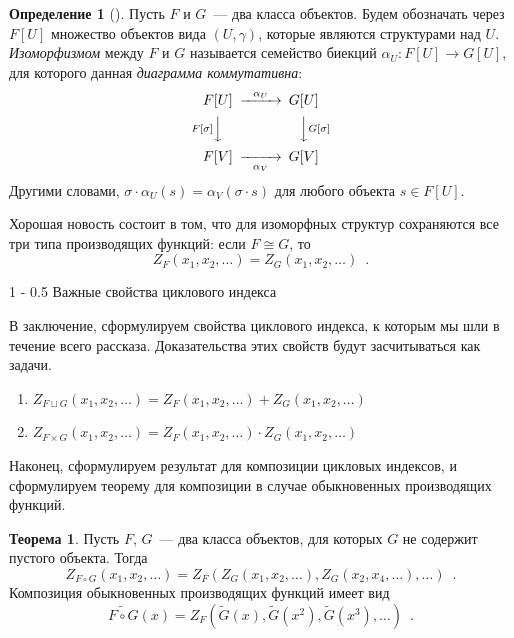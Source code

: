 \documentclass{article}
\makeatletter
\theoremstyle{definition}
\newtheorem*{theorem}{Теорема}
\newtheorem*{definition}{Определение}
\renewcommand{\subsection}{\@startsection
{subsection}%
{1}%
{\z@}%
{-\baselineskip}%
{0.5\baselineskip}%
{\centering\large\scshape}} %
\makeatother
\begin{document}
\begin{definition}[{\cite[Definition 12, p.21]{species}}]
	Пусть \( F \) и \( G \)~--- два класса объектов. Будем обозначать через \( 
	F[U] \) множество объектов вида \( (U, \gamma) \), которые являются 
	структурами над \( U \). \textit{Изоморфизмом} 
	между \( F \) и \( G \) называется семейство биекций \( \alpha_U \colon 
	F[U] \to G[U] \), для которого данная \textit{диаграмма коммутативна}:
	\[
	\begin{CD}
		F[U] @>{\alpha_U}>> G[U]\\
		@V{F[\sigma]}VV @VV{G[\sigma]}V\\
		F[V] @>>{\alpha_V}> G[V]
	\end{CD}
	\]
	Другими словами, \( \sigma \cdot \alpha_U(s) = \alpha_V(\sigma \cdot s) \) 
	для любого объекта \( s \in F[U] \).
\end{definition}

Хорошая новость состоит в том, что для изоморфных структур сохраняются все три 
типа производящих функций: если \( F \cong G \), то 
\[
	Z_F(x_1, x_2, \ldots) = Z_G(x_1, x_2, \ldots) \enspace .
\]

\subsection{Важные свойства циклового индекса}

В заключение, сформулируем свойства циклового индекса, к которым мы шли в 
течение всего рассказа. Доказательства этих свойств будут засчитываться как 
задачи.

\begin{enumerate}
\item \( Z_{F \sqcup G}(x_1, x_2, \ldots) = Z_F(x_1, x_2, \ldots) + Z_G(x_1, 
x_2, \ldots) \)
\item \( Z_{F \times G}(x_1, x_2, \ldots) = Z_F(x_1, x_2, \ldots) \cdot 
Z_G(x_1, x_2, \ldots) \)
\end{enumerate}

Наконец, сформулируем результат для композиции цикловых индексов, и 
сформулируем теорему для композиции в случае обыкновенных производящих функций.

\begin{theorem}
	Пусть \( F \), \( G \)~--- два класса объектов, для 
	которых \( G \) не содержит пустого объекта. Тогда
	\[
		Z_{F \circ G}(x_1, x_2, \ldots) = Z_F(
			Z_G(x_1, x_2, \ldots),
			Z_G(x_2, x_4, \ldots),
			\ldots
		) \enspace .
	\]
	Композиция обыкновенных производящих функций имеет вид
	\[
		\widetilde{F \circ G}(x) = Z_F(\widetilde G(x), \widetilde G(x^2), 
		\widetilde G(x^3), \ldots)
		\enspace .
	\]
\end{theorem}
\end{document}
